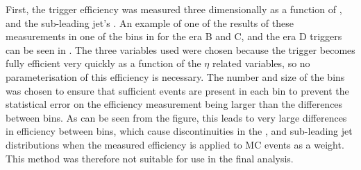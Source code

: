 First, the trigger efficiency was measured three dimensionally as a function of \METnoMU, \Mjj and the sub-leading jet's \pt. An example of one of the results of these measurements in one of the bins in \METnoMU for the era B and C, and the era D triggers can be seen in . The three variables used were chosen because the trigger becomes fully efficient very quickly as a function of the $\eta$ related variables, so no parameterisation of this efficiency is necessary. The number and size of the bins was chosen to ensure that sufficient events are present in each bin to prevent the statistical error on the efficiency measurement being larger than the differences between bins. As can be seen from the figure, this leads to very large differences in efficiency between bins, which cause discontinuities in the \METnoMU, \Mjj and sub-leading jet \pt distributions when the measured efficiency is applied to \ac{MC} events as a weight. This method was therefore not suitable for use in the final analysis.
